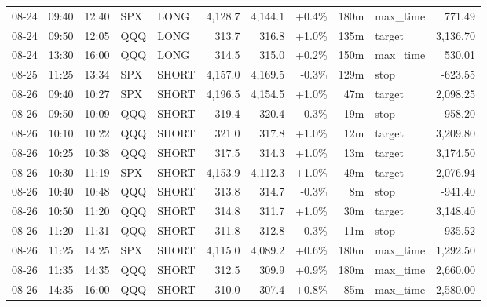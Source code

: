\documentclass[11pt,a4paper,twoside]{article}
\begin{document}
\begin{center}
\begin{longtable}{>{\color{txtmain}}l l l l l r r r r >{\color{txtmain}}l r}
08-24 & 09:40 & 12:40 & SPX & LONG & 4,128.7 & 4,144.1 & \textcolor{wingreen}{+0.4\%} & 180m & max\_time & \textcolor{wingreen}{771.49} \\
08-24 & 09:50 & 12:05 & QQQ & LONG & 313.7 & 316.8 & \textcolor{wingreen}{+1.0\%} & 135m & target & \textcolor{wingreen}{3,136.70} \\
08-24 & 13:30 & 16:00 & QQQ & LONG & 314.5 & 315.0 & \textcolor{wingreen}{+0.2\%} & 150m & max\_time & \textcolor{wingreen}{530.01} \\
08-25 & 11:25 & 13:34 & SPX & SHORT & 4,157.0 & 4,169.5 & \textcolor{lossred}{-0.3\%} & 129m & stop & \textcolor{lossred}{-623.55} \\
08-26 & 09:40 & 10:27 & SPX & SHORT & 4,196.5 & 4,154.5 & \textcolor{wingreen}{+1.0\%} & 47m & target & \textcolor{wingreen}{2,098.25} \\
08-26 & 09:50 & 10:09 & QQQ & SHORT & 319.4 & 320.4 & \textcolor{lossred}{-0.3\%} & 19m & stop & \textcolor{lossred}{-958.20} \\
08-26 & 10:10 & 10:22 & QQQ & SHORT & 321.0 & 317.8 & \textcolor{wingreen}{+1.0\%} & 12m & target & \textcolor{wingreen}{3,209.80} \\
08-26 & 10:25 & 10:38 & QQQ & SHORT & 317.5 & 314.3 & \textcolor{wingreen}{+1.0\%} & 13m & target & \textcolor{wingreen}{3,174.50} \\
08-26 & 10:30 & 11:19 & SPX & SHORT & 4,153.9 & 4,112.3 & \textcolor{wingreen}{+1.0\%} & 49m & target & \textcolor{wingreen}{2,076.94} \\
08-26 & 10:40 & 10:48 & QQQ & SHORT & 313.8 & 314.7 & \textcolor{lossred}{-0.3\%} & 8m & stop & \textcolor{lossred}{-941.40} \\
08-26 & 10:50 & 11:20 & QQQ & SHORT & 314.8 & 311.7 & \textcolor{wingreen}{+1.0\%} & 30m & target & \textcolor{wingreen}{3,148.40} \\
08-26 & 11:20 & 11:31 & QQQ & SHORT & 311.8 & 312.8 & \textcolor{lossred}{-0.3\%} & 11m & stop & \textcolor{lossred}{-935.52} \\
08-26 & 11:25 & 14:25 & SPX & SHORT & 4,115.0 & 4,089.2 & \textcolor{wingreen}{+0.6\%} & 180m & max\_time & \textcolor{wingreen}{1,292.50} \\
08-26 & 11:35 & 14:35 & QQQ & SHORT & 312.5 & 309.9 & \textcolor{wingreen}{+0.9\%} & 180m & max\_time & \textcolor{wingreen}{2,660.00} \\
08-26 & 14:35 & 16:00 & QQQ & SHORT & 310.0 & 307.4 & \textcolor{wingreen}{+0.8\%} & 85m & max\_time & \textcolor{wingreen}{2,580.00} \\

\end{longtable}
\end{center}
\end{document}
